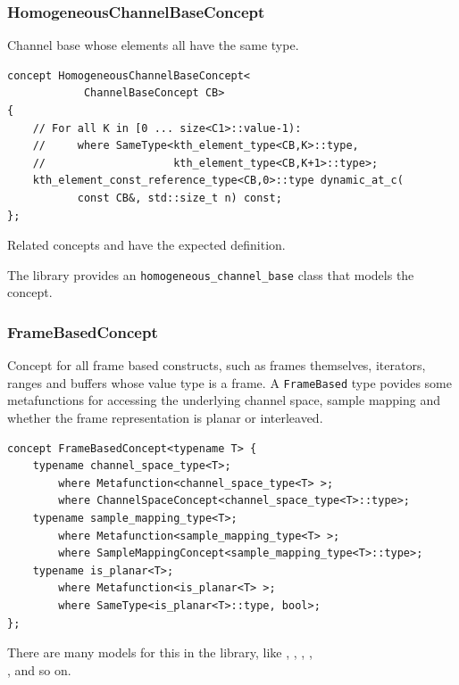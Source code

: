 \subsubsection{{HomogeneousChannelBaseConcept}}

Channel base whose elements all have the same type.

\begin{lstlisting}
concept HomogeneousChannelBaseConcept<
            ChannelBaseConcept CB> 
{
    // For all K in [0 ... size<C1>::value-1):
    //     where SameType<kth_element_type<CB,K>::type,
    //                    kth_element_type<CB,K+1>::type>;    
    kth_element_const_reference_type<CB,0>::type dynamic_at_c(
           const CB&, std::size_t n) const;
};  
\end{lstlisting}

Related concepts  and
 have the expected
definition.

The library provides an \texttt{homogeneous\_channel\_base} class that
models the concept.

\subsubsection{{FrameBasedConcept}}

Concept for all frame based constructs, such as frames themselves,
iterators, ranges and buffers whose value type is a frame. A
\texttt{FrameBased} type povides some metafunctions for accessing the
underlying channel space, sample mapping and whether the frame
representation is planar or interleaved.
  
\begin{lstlisting}
concept FrameBasedConcept<typename T> {
    typename channel_space_type<T>;     
        where Metafunction<channel_space_type<T> >;
        where ChannelSpaceConcept<channel_space_type<T>::type>;
    typename sample_mapping_type<T>; 
        where Metafunction<sample_mapping_type<T> >;  
        where SampleMappingConcept<sample_mapping_type<T>::type>;
    typename is_planar<T>;
        where Metafunction<is_planar<T> >;
        where SameType<is_planar<T>::type, bool>;
};  
\end{lstlisting}

There are many models for this in the library, like ,
, , ,\\
,  and so on.

